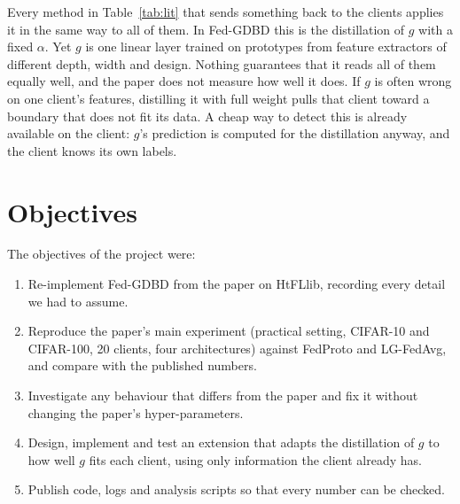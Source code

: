 Every method in Table~\ref{tab:lit} that sends something back to the clients applies it in the same way to all of them. In Fed-GDBD this is the distillation of $g$ with a fixed $\alpha$. Yet $g$ is one linear layer trained on prototypes from feature extractors of different depth, width and design. Nothing guarantees that it reads all of them equally well, and the paper does not measure how well it does. If $g$ is often wrong on one client's features, distilling it with full weight pulls that client toward a boundary that does not fit its data. A cheap way to detect this is already available on the client: $g$'s prediction is computed for the distillation anyway, and the client knows its own labels.

\section{Objectives}

The objectives of the project were:
\begin{enumerate}
\item Re-implement Fed-GDBD from the paper on HtFLlib, recording every detail we had to assume.
\item Reproduce the paper's main experiment (practical setting, CIFAR-10 and CIFAR-100, 20 clients, four architectures) against FedProto and LG-FedAvg, and compare with the published numbers.
\item Investigate any behaviour that differs from the paper and fix it without changing the paper's hyper-parameters.
\item Design, implement and test an extension that adapts the distillation of $g$ to how well $g$ fits each client, using only information the client already has.
\item Publish code, logs and analysis scripts so that every number can be checked.
\end{enumerate}
